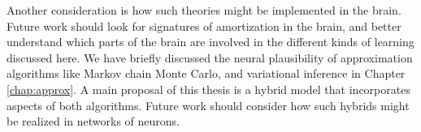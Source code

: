 Another consideration is how such theories might be implemented in the brain. Future work should look for signatures of amortization in the brain, and better understand which parts of the brain are involved in the different kinds of learning discussed here. We have briefly discussed the neural plausibility of approximation algorithms like Markov chain Monte Carlo, and variational inference in Chapter \ref{chap:approx}. A main proposal of this thesis is a hybrid model that incorporates aspects of both algorithms. Future work should consider how such hybrids might be realized in networks of neurons.





